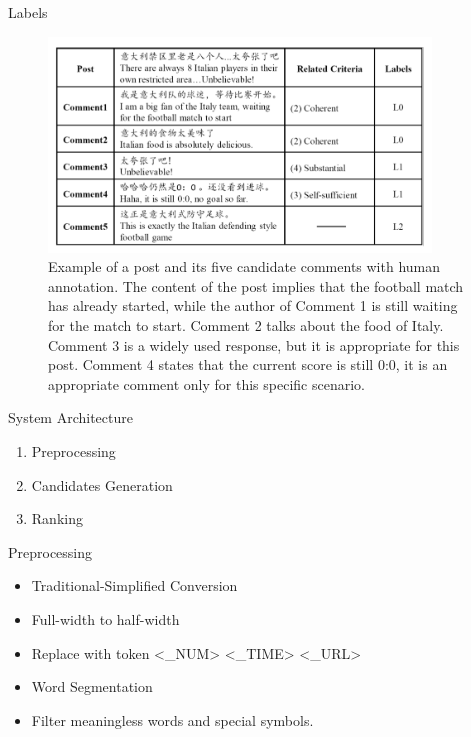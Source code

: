 \documentclass{beamer}
\begin{document}
    \begin{frame}{Labels}
      \begin{center}
        \begin{figure}
        \includegraphics[width=4in,height=2.25in]{stc-labels.png}
        \caption{Example of a post and its five candidate comments with human annotation. The content of the post implies that the football match has already started, while the author of Comment 1 is still waiting for the match to start. Comment 2 talks about the food of Italy. Comment 3 is a widely used response, but it is
appropriate for this post. Comment 4 states that the current score is still 0:0, it is an appropriate comment only for this specific scenario.}
        \end{figure}
      \end{center}
    \end{frame}

    \begin{frame}{System Architecture}
      \begin{enumerate}
        \item Preprocessing \newline
        \item Candidates Generation \newline
        \item Ranking
      \end{enumerate}
    \end{frame}

    \begin{frame}{Preprocessing}
      \begin{itemize}
        \item Traditional-Simplified Conversion
        \item Full-width to half-width
        \item Replace with token <\_NUM> <\_TIME> <\_URL>
        \item Word Segmentation
        \item Filter meaningless words and special symbols.
      \end{itemize}
    \end{frame}
\end{document}
